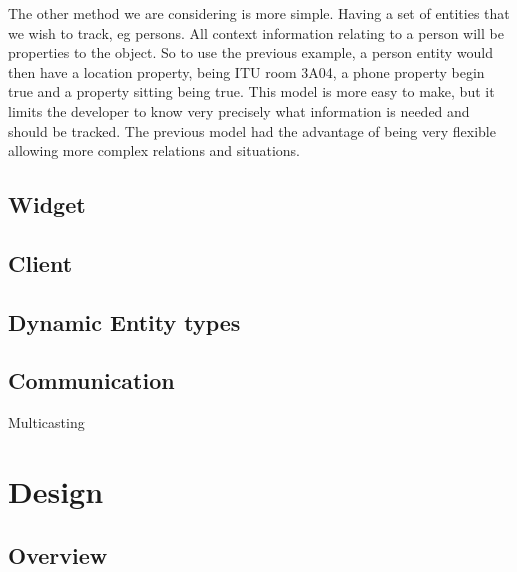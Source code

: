 \documentclass[]{report}
\begin{document}
The other method we are considering is more simple. Having a set of entities that we wish to track, eg persons. All context information relating to a person will be properties to the object. So to use the previous example, a person entity would then have a location property, being ITU room 3A04, a phone property begin true and a property sitting being true. This model is more easy to make, but it limits the developer to know very precisely what information is needed and should be tracked. The previous model had the advantage of being very flexible allowing more complex relations and situations. 



\section{Widget}

\section{Client}


\section{Dynamic Entity types}


\section{Communication}

Multicasting




\chapter{Design}




\section{Overview}
\end{document}
